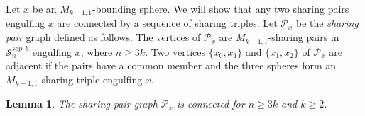 \documentclass[11pt]{article}
\DeclareMathOperator{\aaut}{Aut}
\newtheorem{lemma}[theorem]{Lemma}
\theoremstyle{remark}
\theoremstyle{definition}
\begin{document}
Let $x$ be an $M_{k-1,1}$-bounding sphere.
We will show that any two sharing pairs engulfing $x$
are connected by a sequence of sharing triples.
Let $\mathcal P_x$ be the \emph{sharing pair} graph defined as follows.
The vertices of $\mathcal P_x$ are $M_{k-1,1}$-sharing pairs in
$\mathcal S^{sep,k}_n$ engulfing
$x$, where $n\geq 3k$.
Two vertices $\{x_0,x_1\}$ and $\{x_1,x_2\}$
of $\mathcal P_x$ are adjacent if the pairs
have a common member and the three spheres
form an $M_{k-1,1}$-sharing triple engulfing $x$.



\begin{lemma}
  The sharing pair graph $\mathcal P_x$ is connected for $n\geq 3k$ and $k\geq 2$.
  \label{lem:kshareconnect}
\end{lemma}
\end{document}
